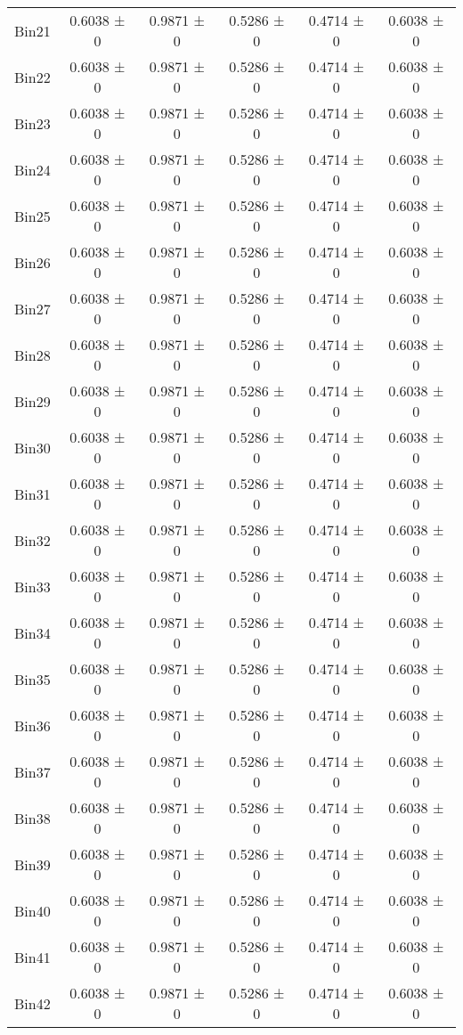 \begin{tabular}{@{\extracolsep{4pt}}lccccc@{}}
     Bin21 & 0.6038 ± 0 & 0.9871 ± 0 & 0.5286 ± 0 & 0.4714 ± 0 & 0.6038 ± 0 \\ 
     Bin22 & 0.6038 ± 0 & 0.9871 ± 0 & 0.5286 ± 0 & 0.4714 ± 0 & 0.6038 ± 0 \\ 
     Bin23 & 0.6038 ± 0 & 0.9871 ± 0 & 0.5286 ± 0 & 0.4714 ± 0 & 0.6038 ± 0 \\ 
     Bin24 & 0.6038 ± 0 & 0.9871 ± 0 & 0.5286 ± 0 & 0.4714 ± 0 & 0.6038 ± 0 \\ 
     Bin25 & 0.6038 ± 0 & 0.9871 ± 0 & 0.5286 ± 0 & 0.4714 ± 0 & 0.6038 ± 0 \\ 
     Bin26 & 0.6038 ± 0 & 0.9871 ± 0 & 0.5286 ± 0 & 0.4714 ± 0 & 0.6038 ± 0 \\ 
     Bin27 & 0.6038 ± 0 & 0.9871 ± 0 & 0.5286 ± 0 & 0.4714 ± 0 & 0.6038 ± 0 \\ 
     Bin28 & 0.6038 ± 0 & 0.9871 ± 0 & 0.5286 ± 0 & 0.4714 ± 0 & 0.6038 ± 0 \\ 
     Bin29 & 0.6038 ± 0 & 0.9871 ± 0 & 0.5286 ± 0 & 0.4714 ± 0 & 0.6038 ± 0 \\ 
     Bin30 & 0.6038 ± 0 & 0.9871 ± 0 & 0.5286 ± 0 & 0.4714 ± 0 & 0.6038 ± 0 \\ 
     Bin31 & 0.6038 ± 0 & 0.9871 ± 0 & 0.5286 ± 0 & 0.4714 ± 0 & 0.6038 ± 0 \\ 
     Bin32 & 0.6038 ± 0 & 0.9871 ± 0 & 0.5286 ± 0 & 0.4714 ± 0 & 0.6038 ± 0 \\ 
     Bin33 & 0.6038 ± 0 & 0.9871 ± 0 & 0.5286 ± 0 & 0.4714 ± 0 & 0.6038 ± 0 \\ 
     Bin34 & 0.6038 ± 0 & 0.9871 ± 0 & 0.5286 ± 0 & 0.4714 ± 0 & 0.6038 ± 0 \\ 
     Bin35 & 0.6038 ± 0 & 0.9871 ± 0 & 0.5286 ± 0 & 0.4714 ± 0 & 0.6038 ± 0 \\ 
     Bin36 & 0.6038 ± 0 & 0.9871 ± 0 & 0.5286 ± 0 & 0.4714 ± 0 & 0.6038 ± 0 \\ 
     Bin37 & 0.6038 ± 0 & 0.9871 ± 0 & 0.5286 ± 0 & 0.4714 ± 0 & 0.6038 ± 0 \\ 
     Bin38 & 0.6038 ± 0 & 0.9871 ± 0 & 0.5286 ± 0 & 0.4714 ± 0 & 0.6038 ± 0 \\ 
     Bin39 & 0.6038 ± 0 & 0.9871 ± 0 & 0.5286 ± 0 & 0.4714 ± 0 & 0.6038 ± 0 \\ 
     Bin40 & 0.6038 ± 0 & 0.9871 ± 0 & 0.5286 ± 0 & 0.4714 ± 0 & 0.6038 ± 0 \\ 
     Bin41 & 0.6038 ± 0 & 0.9871 ± 0 & 0.5286 ± 0 & 0.4714 ± 0 & 0.6038 ± 0 \\ 
     Bin42 & 0.6038 ± 0 & 0.9871 ± 0 & 0.5286 ± 0 & 0.4714 ± 0 & 0.6038 ± 0 \\ 

\end{tabular}
